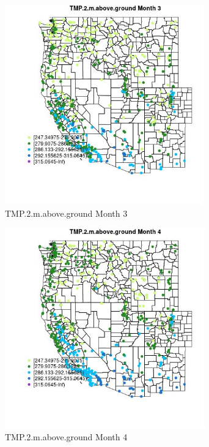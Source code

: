 \begin{figure} 
\centering  
\includegraphics[width=0.77\textwidth]{Code_Outputs/Report_ML_input_PM25_Step4_part_e_de_duplicated_aves_compiled_2019-05-14wNAs_MapObsMo3TMP2maboveground.jpg} 
\caption{\label{fig:Report_ML_input_PM25_Step4_part_e_de_duplicated_aves_compiled_2019-05-14wNAsMapObsMo3TMP2maboveground}TMP.2.m.above.ground Month 3} 
\end{figure} 
 

\begin{figure} 
\centering  
\includegraphics[width=0.77\textwidth]{Code_Outputs/Report_ML_input_PM25_Step4_part_e_de_duplicated_aves_compiled_2019-05-14wNAs_MapObsMo4TMP2maboveground.jpg} 
\caption{\label{fig:Report_ML_input_PM25_Step4_part_e_de_duplicated_aves_compiled_2019-05-14wNAsMapObsMo4TMP2maboveground}TMP.2.m.above.ground Month 4} 
\end{figure} 
 

